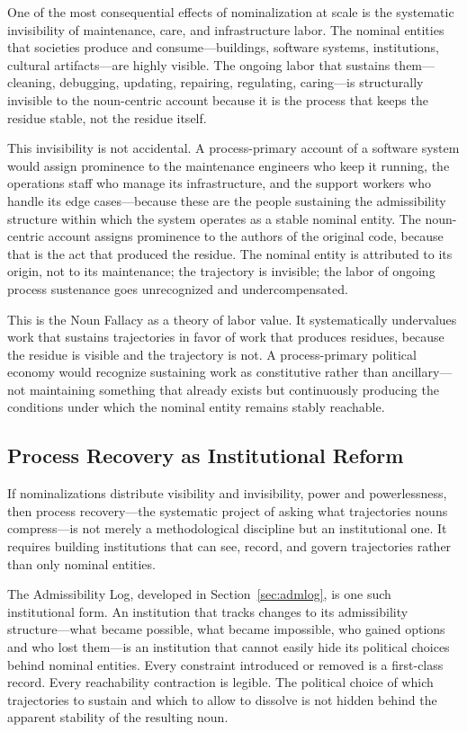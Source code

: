 \documentclass[12pt, a4paper]{article}
\theoremstyle{plain}
\theoremstyle{definition}
\theoremstyle{remark}
\begin{document}
One of the most consequential effects of nominalization at scale is the
systematic invisibility of maintenance, care, and infrastructure labor. The
nominal entities that societies produce and consume---buildings, software
systems, institutions, cultural artifacts---are highly visible. The ongoing
labor that sustains them---cleaning, debugging, updating, repairing,
regulating, caring---is structurally invisible to the noun-centric account
because it is the process that keeps the residue stable, not the residue
itself.

This invisibility is not accidental. A process-primary account of a software
system would assign prominence to the maintenance engineers who keep it
running, the operations staff who manage its infrastructure, and the support
workers who handle its edge cases---because these are the people sustaining
the admissibility structure within which the system operates as a stable
nominal entity. The noun-centric account assigns prominence to the authors
of the original code, because that is the act that produced the residue.
The nominal entity is attributed to its origin, not to its maintenance; the
trajectory is invisible; the labor of ongoing process sustenance goes
unrecognized and undercompensated.

This is the Noun Fallacy as a theory of labor value. It systematically
undervalues work that sustains trajectories in favor of work that produces
residues, because the residue is visible and the trajectory is not. A
process-primary political economy would recognize sustaining work as
constitutive rather than ancillary---not maintaining something that already
exists but continuously producing the conditions under which the nominal
entity remains stably reachable.

\subsection{Process Recovery as Institutional Reform}

If nominalizations distribute visibility and invisibility, power and
powerlessness, then process recovery---the systematic project of asking what
trajectories nouns compress---is not merely a methodological discipline
but an institutional one. It requires building institutions that can see,
record, and govern trajectories rather than only nominal entities.

The Admissibility Log, developed in Section~\ref{sec:admlog}, is one such
institutional form. An institution that tracks changes to its admissibility
structure---what became possible, what became impossible, who gained options
and who lost them---is an institution that cannot easily hide its political
choices behind nominal entities. Every constraint introduced or removed is
a first-class record. Every reachability contraction is legible. The political
choice of which trajectories to sustain and which to allow to dissolve is
not hidden behind the apparent stability of the resulting noun.
\end{document}
